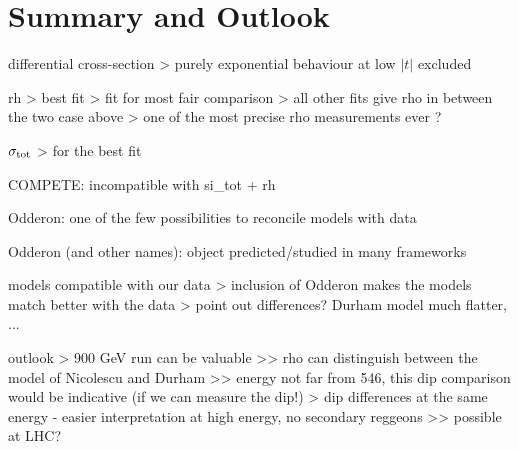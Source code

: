 \section{Summary and Outlook}
\label{sec:summary}

\bgroup
\parskip0pt

\> differential cross-section
\>> purely exponential behaviour at low $|t|$ excluded

\> rh
\>> best fit
\>> fit for most fair comparison
\>> all other fits give rho in between the two case above
\>> one of the most precise rho measurements ever ?

\> $\sigma_{\rm tot}$
\>> for the best fit

\> COMPETE: incompatible with si\_tot + rh

\> Odderon: one of the few possibilities to reconcile models with data

\> Odderon (and other names): object predicted/studied in many frameworks

\> models compatible with our data
\>> inclusion of Odderon makes the models match better with the data
\>> point out differences? Durham model much flatter, ...

\> outlook
\>> 900 GeV run can be valuable
\>>> rho can distinguish between the model of Nicolescu and Durham
\>>> energy not far from 546, this dip comparison would be indicative (if we can measure the dip!)
\>> dip differences at the same energy - easier interpretation at high energy, no secondary reggeons
\>>> possible at LHC?
 
\egroup
